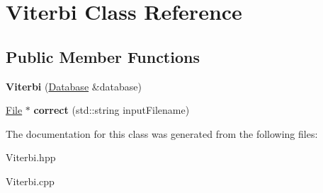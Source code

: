 \hypertarget{classViterbi}{}\section{Viterbi Class Reference}
\label{classViterbi}
\subsection*{Public Member Functions}
\begin{DoxyCompactItemize}
\item 
\mbox{\label{classViterbi_ae99b04e927af06a69689ad333f6069b5}} 
{\bfseries Viterbi} (\hyperlink{classDatabase}{Database} \&database)
\item 
\mbox{\label{classViterbi_ac7b573f62eea989f1abbfbabb0bcdaa0}} 
\hyperlink{classFile}{File} $\ast$ {\bfseries correct} (std\+::string input\+Filename)
\end{DoxyCompactItemize}


The documentation for this class was generated from the following files\+:\begin{DoxyCompactItemize}
\item 
Viterbi.\+hpp\item 
Viterbi.\+cpp\end{DoxyCompactItemize}
